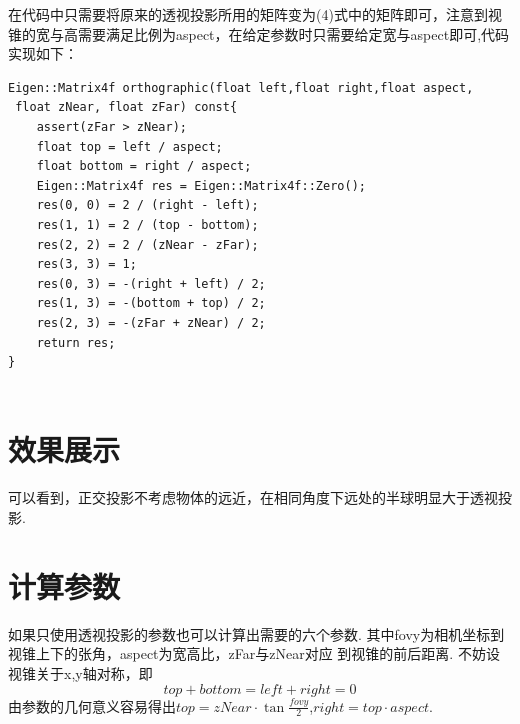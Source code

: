 \documentclass[12pt]{article}
\begin{document}
在代码中只需要将原来的透视投影所用的矩阵变为(4)式中的矩阵即可，注意到视锥的宽与高需要满足比例为aspect，在给定参数时只需要给定宽与aspect即可,代码实现如下：
\begin{lstlisting}
Eigen::Matrix4f orthographic(float left,float right,float aspect,
 float zNear, float zFar) const{
    assert(zFar > zNear);
    float top = left / aspect;
    float bottom = right / aspect;
    Eigen::Matrix4f res = Eigen::Matrix4f::Zero();
    res(0, 0) = 2 / (right - left);
    res(1, 1) = 2 / (top - bottom);
    res(2, 2) = 2 / (zNear - zFar);
    res(3, 3) = 1;
    res(0, 3) = -(right + left) / 2;
    res(1, 3) = -(bottom + top) / 2;
    res(2, 3) = -(zFar + zNear) / 2;
    return res;
}
    
\end{lstlisting}

\section{效果展示}

\begin{figure}[htbp]
    \centering
\end{figure}

可以看到，正交投影不考虑物体的远近，在相同角度下远处的半球明显大于透视投影.

\section{计算参数}
如果只使用透视投影的参数也可以计算出需要的六个参数. 其中fovy为相机坐标到视锥上下的张角，aspect为宽高比，zFar与zNear对应
到视锥的前后距离. 不妨设视锥关于x,y轴对称，即
\begin{equation}
    top+bottom=left+right=0
\end{equation}
由参数的几何意义容易得出$top=zNear \cdot \tan\frac{fovy}{2}$,$right=top\cdot aspect$.
\end{document}
